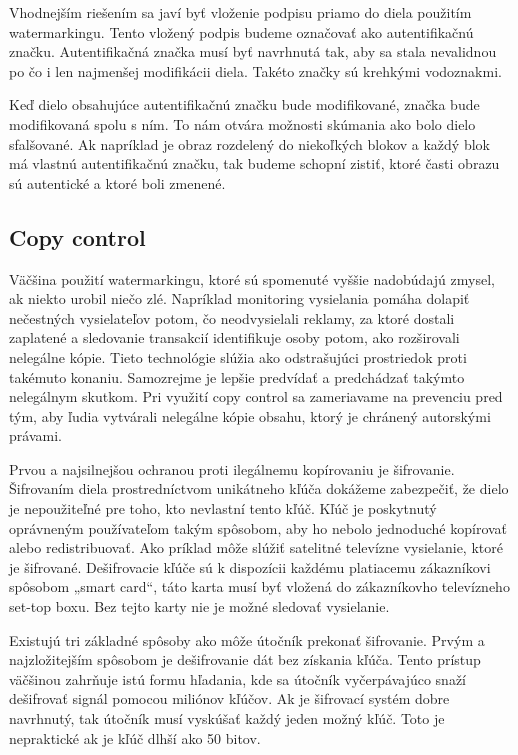 Vhodnejším riešením sa javí byť vloženie podpisu priamo do diela použitím watermarkingu. Tento vložený podpis budeme označovať ako autentifikačnú značku. Autentifikačná značka musí byť navrhnutá tak, aby sa stala nevalidnou po čo i len najmenšej modifikácii diela. Takéto značky sú krehkými vodoznakmi.

Keď dielo obsahujúce autentifikačnú značku bude modifikované, značka bude modifikovaná spolu s ním. To nám otvára možnosti skúmania ako bolo dielo sfalšované. Ak napríklad je obraz rozdelený do niekoľkých blokov a každý blok má vlastnú autentifikačnú značku, tak budeme schopní zistiť, ktoré časti obrazu sú autentické a ktoré boli zmenené. \cite{Cox}

\subsection{Copy control}
Väčšina použití watermarkingu, ktoré sú spomenuté vyššie nadobúdajú zmysel, ak niekto urobil niečo zlé. Napríklad monitoring vysielania pomáha dolapiť nečestných vysielateľov potom, čo neodvysielali reklamy, za ktoré dostali zaplatené a sledovanie transakcií identifikuje osoby potom, ako rozširovali nelegálne kópie. Tieto technológie slúžia ako odstrašujúci prostriedok proti takémuto konaniu. Samozrejme je lepšie predvídať a predchádzať takýmto nelegálnym skutkom. Pri využití copy control sa zameriavame na prevenciu pred tým, aby ľudia vytvárali nelegálne kópie obsahu, ktorý je chránený autorskými právami.

Prvou a najsilnejšou ochranou proti ilegálnemu kopírovaniu je šifrovanie. Šifrovaním diela prostredníctvom unikátneho kľúča dokážeme zabezpečiť, že dielo je nepoužiteľné pre toho, kto nevlastní tento kľúč. Kľúč je poskytnutý oprávneným používateľom takým spôsobom, aby ho nebolo jednoduché kopírovať alebo redistribuovať. Ako príklad môže slúžiť satelitné televízne vysielanie, ktoré je šifrované. Dešifrovacie kľúče sú k dispozícii každému platiacemu zákazníkovi spôsobom „smart card“, táto karta musí byť vložená do zákazníkovho televízneho set-top boxu. Bez tejto karty nie je možné sledovať vysielanie.

Existujú tri základné spôsoby ako môže útočník prekonať šifrovanie. Prvým a najzložitejším spôsobom je dešifrovanie dát bez získania kľúča. Tento prístup väčšinou zahrňuje istú formu hľadania, kde sa útočník vyčerpávajúco snaží dešifrovať signál pomocou miliónov kľúčov. Ak je šifrovací systém dobre navrhnutý, tak útočník musí vyskúšať každý jeden možný kľúč. Toto je nepraktické ak je kľúč dlhší ako 50 bitov.

